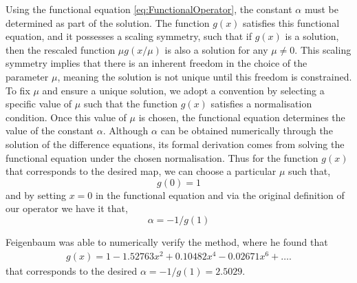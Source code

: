 Using the functional equation \eqref{eq:FunctionalOperator}, the constant $\alpha$ must be determined as part of the solution. The function $g(x)$ satisfies this functional equation, and it possesses a scaling symmetry, such that if $g(x)$ is a solution, then the rescaled function $\mu g(x/\mu)$ is also a solution for any $\mu \neq 0$. This scaling symmetry implies that there is an inherent freedom in the choice of the parameter $\mu$, meaning the solution is not unique until this freedom is constrained. To fix $\mu$ and ensure a unique solution, we adopt a convention by selecting a specific value of $\mu$ such that the function $g(x)$ satisfies a normalisation condition. Once this value of $\mu$ is chosen, the functional equation determines the value of the constant $\alpha$. Although $\alpha$ can be obtained numerically through the solution of the difference equations, its formal derivation comes from solving the functional equation under the chosen normalisation. Thus for the function $g(x)$ that corresponds to the desired map, we can choose a particular $\mu$ such that,
$$
g(0)=1
$$
and by setting $x=0$ in the functional equation and via the original definition of our operator we have it that,
$$
\alpha = -1/g(1)
$$

Feigenbaum was able to numerically verify the method, where he found that
\begin{align}
    g(x)= 1 - 1.52763x^2 + 0.10482x^4- 0.02671x^6 + \dots .\label{eq:feigenbaum}
\end{align}
that corresponds to the desired $\alpha =-1/g(1)=2.5029$.

